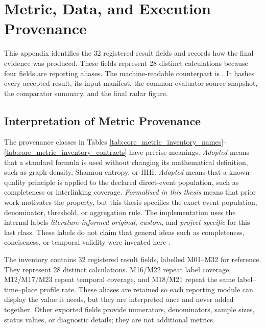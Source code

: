 \chapter{Metric, Data, and Execution Provenance}

This appendix identifies the 32 registered result fields and records how the final evidence was produced. These fields represent 28 distinct calculations because four fields are reporting aliases. The machine-readable counterpart is . It hashes every accepted result, its input manifest, the common evaluator source snapshot, the comparator summary, and the final radar figure.



\section{Interpretation of Metric Provenance}

The provenance classes in Tables \ref{tab:core_metric_inventory_names}--\ref{tab:core_metric_inventory_contracts} have precise meanings. \emph{Adopted} means that a standard formula is used without changing its mathematical definition, such as graph density, Shannon entropy, or HHI. \emph{Adapted} means that a known quality principle is applied to the declared direct-event population, such as completeness or interlinking coverage. \emph{Formalised in this thesis} means that prior work motivates the property, but this thesis specifies the exact event population, denominator, threshold, or aggregation rule. The implementation uses the internal labels \emph{literature-informed original}, \emph{custom}, and \emph{project-specific} for this last class. These labels do not claim that general ideas such as completeness, conciseness, or temporal validity were invented here \citep{newman2018,zaveri2016,shannon1948,gini1912,hirschman1964}.

The inventory contains 32 registered result fields, labelled M01--M32 for reference. They represent 28 distinct calculations. M16/M22 repeat label coverage, M12/M17/M23 repeat temporal coverage, and M18/M21 repeat the same label--time--place profile rate. These aliases are retained so each reporting module can display the value it needs, but they are interpreted once and never added together. Other exported fields provide numerators, denominators, sample sizes, status values, or diagnostic details; they are not additional metrics.

